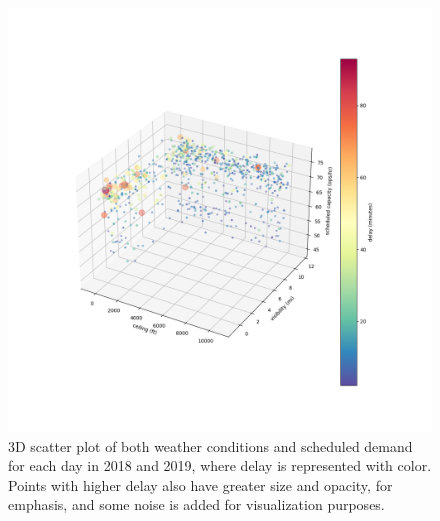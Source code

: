 \begin{figure}[htb!]
    \centering
    \includegraphics[width=\linewidth]{media/lga-analysis-17.png}
    \caption{3D scatter plot of both weather conditions and scheduled demand for each day in 2018 and 2019, where delay is represented with color. Points with higher delay also have greater size and opacity, for emphasis, and some noise is added for visualization purposes. }
    \label{fig:bubble3d-all}
\end{figure}

